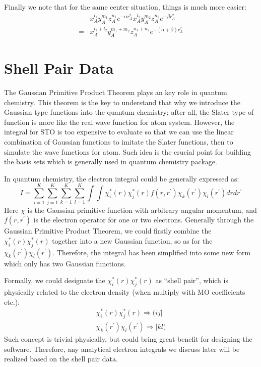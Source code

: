 Finally we note that for the same center situation, things is much more easier:
\begin{align}
&  x_{A}^{l_{1}}y_{A}^{m_{1}}z_{A}^{n_{1}}e^{-\alpha r_{A}^{2}}
   x_{A}^{l_{2}}y_{A}^{m_{2}}z_{A}^{n_{2}}e^{-\beta  r_{A}^{2}} \nonumber \\
=& x_{A}^{l_{1}+l_{2}}y_{A}^{m_{1}+m_{2}}z_{A}^{n_{1}+n_{2}}e^{-(\alpha+\beta)r_{A}^{2}}
  \label{gaussian_product_rule_eq:21}
\end{align} 


\section{Shell Pair Data}
%
%
%
%
The Gaussian Primitive Product Theorem plays an key role in quantum chemistry\cite{SFBoys1950}. This
theorem is the key to understand that why we introduce the Gaussian type functions into the quantum 
chemistry; after all, the Slater type of function is more like the real wave function for atom system.
However, the integral for STO is too expensive to evaluate so that  we can use the linear combination 
of Gaussian functions to imitate the Slater functions, then to simulate the wave functions for atom.
Such idea is the crucial point for building the basis sets which is generally used in quantum chemistry
package.

In quantum chemistry, the electron integral could be generally expressed as:
\begin{equation}
 \label{shell_pair_eq:1}
I = \sum_{i=1}^{K}\sum_{j=1}^{K}\sum_{k=1}^{K}\sum_{l=1}^{K}
\int \int \chi_{i}^{*}(r)\chi_{j}^{*}(r)f(r,r^{'})
\chi_{k}(r^{'})\chi_{l}(r^{'}) dr dr^{'}
\end{equation}
Here $\chi$ is the Gaussian primitive function with arbitrary angular momentum, and $f(r,r^{'})$ is the 
electron operator for one or two electrons. Generally through the Gaussian Primitive Product Theorem, 
we could firstly combine the $ \chi_{i}^{*}(r)\chi_{j}^{*}(r)$ together into a new Gaussian function, 
so as for the $\chi_{k}(r^{'})\chi_{l}(r^{'})$. Therefore, the integral has been simplified into some
new form which only has two Gaussian functions.

Formally, we could designate the $ \chi_{i}^{*}(r)\chi_{j}^{*}(r)$ as ``shell pair'', which is 
physically related to the electron density (when multiply with MO coefficients etc.):
\begin{align}
\label{shell_pair_eq:2}
 \chi_{i}^{*}(r)\chi_{j}^{*}(r) \Longrightarrow (ij| \nonumber \\
 \chi_{k}(r^{'})\chi_{l}(r^{'}) \Longrightarrow |kl)
\end{align}
Such concept is trivial physically, but could bring great benefit for designing the software. 
Therefore, any analytical electron integrals we discuss later will be realized based on the shell pair
data.
    

